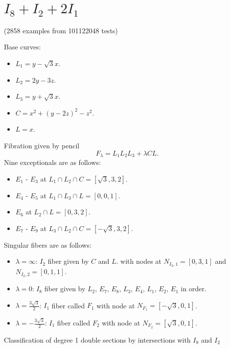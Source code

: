 \documentclass{article}
\begin{document}
\section{$I_8 + I_2 + 2I_1$}

(2858 examples from 101122048 tests)

Base curves:
\begin{itemize}
  \item $L_1 = y - \sqrt{3}x$.
  \item $L_2 = 2y - 3z$.
  \item $L_3 = y + \sqrt{3}x$.
  \item $C = x^2 + (y-2z)^2 - z^2$.
  \item $L = x$.
\end{itemize}
Fibration given by pencil
\[F_{\lambda} = L_1L_2L_3 + \lambda CL.\]
Nine exceptionals are as follows:
\begin{itemize}
  \item $E_1$ - $E_3$ at $L_1 \cap L_2 \cap C = [\sqrt{3},3,2]$.
  \item $E_4$ - $E_5$ at $L_1 \cap L_3 \cap L = [0,0,1]$.
  \item $E_6$ at $L_2 \cap L = [0,3,2]$.
  \item $E_7$ - $E_9$ at $L_3 \cap L_2 \cap C = [-\sqrt{3},3,2]$.
\end{itemize}
Singular fibers are as follows:
\begin{itemize}
  \item $\lambda = \infty$: $I_2$ fiber given by $C$ and $L$. with nodes at $N_{I_2,1} = [0,3,1]$ and $N_{I_2,2} = [0,1,1]$.
  \item $\lambda = 0$: $I_8$ fiber given by $L_2$, $E_7$, $E_8$, $L_3$, $E_4$, $L_1$, $E_2$, $E_1$ in order.
  \item $\lambda = \frac{3\sqrt{3}}{2}$: $I_1$ fiber called $F_1$ with node at $N_{F_1} = [-\sqrt{3},0,1]$.
  \item $\lambda = -\frac{3\sqrt{3}}{2}$: $I_1$ fiber called $F_2$ with node at $N_{F_2} = [\sqrt{3},0,1]$.
\end{itemize}

\begin{center}
Classification of degree 1 double sections by intersections with $I_8$ and $I_2$
\end{center}
\end{document}
